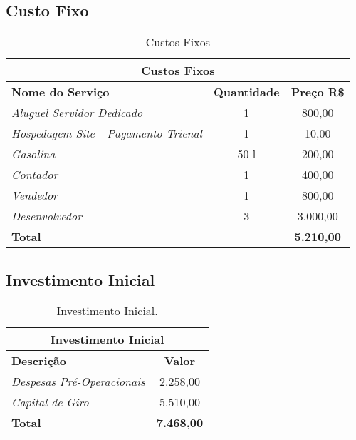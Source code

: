         \subsection{Custo Fixo}
		
		\begin{table}[htbp]
			\centering
			\caption{Custos Fixos}
			
			
			\begin{tabularx}{\linewidth}{|X|c|c|}
				\toprule
				\multicolumn{3}{c}{\cellcolor{gray!50}\textbf{Custos Fixos}} \\
				\midrule
				\textbf{Nome do Serviço} & \textbf{Quantidade} & \textbf{Preço R\$} \\
				\midrule
				\textit{Aluguel Servidor Dedicado}		&	1	& 800,00 \\
				\textit{Hospedagem Site - Pagamento Trienal}		&	1	& 10,00 \\
				\textit{Gasolina}						&	50 l& 200,00 \\
				\textit{Contador}						&	1	& 400,00 \\
				\textit{Vendedor}						&	1	& 800,00 \\
				\textit{Desenvolvedor}					&	3	& 3.000,00 \\
                \midrule
				\textbf{Total}									& ~ & \textbf{5.210,00} \\
				\bottomrule
			\end{tabularx}
			
			
			\label{tab:receitasfixas}%
		\end{table}%
        
        
        
        \subsection{Investimento Inicial}
        
		\begin{table}[htbp]
			\centering
			\caption{Investimento Inicial.}
			
			
				\begin{tabularx}{\linewidth}{|X|c|}
					\toprule
					\multicolumn{2}{c}{\cellcolor{gray!50}\textbf{Investimento Inicial}} \\
					\midrule
					\textbf{Descrição} & \textbf{Valor}  \\
					\midrule
					\textit{Despesas Pré-Operacionais}		&	2.258,00 \\
					\textit{Capital de Giro}	&	5.510,00 \\
					\midrule
					\textbf{Total}			& \textbf{7.468,00} \\
					\bottomrule
				\end{tabularx}
			
			
			\label{tab:investimentoInicial}%
		\end{table}%
        
